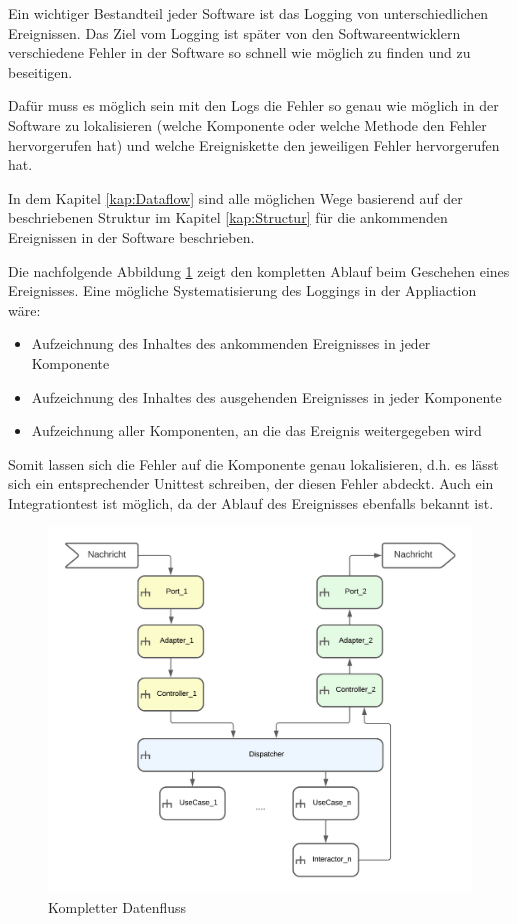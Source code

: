 Ein wichtiger Bestandteil jeder Software ist das Logging von unterschiedlichen Ereignissen.
Das Ziel vom Logging ist später von den Softwareentwicklern verschiedene Fehler in der Software so schnell wie möglich zu finden und
zu beseitigen.

Dafür muss es möglich sein mit den Logs die Fehler so genau wie möglich in der Software zu lokalisieren 
(welche Komponente oder welche Methode den Fehler hervorgerufen hat) 
und welche Ereigniskette den jeweiligen Fehler hervorgerufen hat.

In dem Kapitel \ref{kap:Dataflow} sind alle möglichen Wege basierend auf der beschriebenen Struktur 
im Kapitel \ref{kap:Structur} für die ankommenden Ereignissen in der Software beschrieben.

Die nachfolgende Abbildung \ref{fig:FullDataFlow} zeigt den kompletten Ablauf beim Geschehen eines Ereignisses.
Eine mögliche Systematisierung des Loggings in der Appliaction wäre: 
\begin{itemize}
    \item Aufzeichnung des Inhaltes des ankommenden Ereignisses in jeder Komponente
    \item Aufzeichnung des Inhaltes des ausgehenden Ereignisses in jeder Komponente 
    \item Aufzeichnung aller Komponenten, an die das Ereignis weitergegeben wird
\end{itemize}

Somit lassen sich die Fehler auf die Komponente genau lokalisieren, d.h. es lässt sich ein entsprechender Unittest schreiben, 
der diesen Fehler abdeckt. Auch ein Integrationtest ist möglich, da der Ablauf des Ereignisses ebenfalls bekannt ist.


\begin{figure}[H]
    \centering
    \includegraphics[width=12cm]{./images/FullDataFlow.png}
     \caption[Kompletter Datenfluss]{Kompletter Datenfluss}
     \label{fig:FullDataFlow}
\end{figure}
